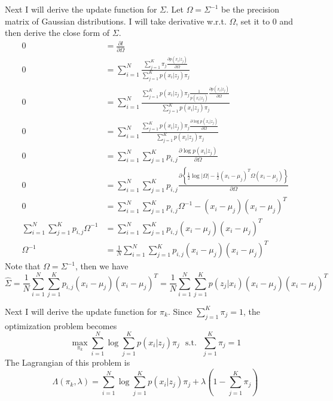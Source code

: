 \documentclass[12pt,oneside,a4paper]{article}
\begin{document}
Next I will derive the update function for $\Sigma$. Let $\Omega = \Sigma^{-1}$ be the precision matrix of Gaussian distributions. I will take derivative w.r.t. $\Omega$, set it to 0 and then derive the close form of $\Sigma$.
\begin{equation*}
\begin{aligned}
0 &= \frac{\partial l}{\partial \Omega}\\
0 &= \sum_{i = 1}^{N}\frac{\sum_{j = 1}^{K}\pi_{j}\frac{\partial p(x_{i}|z_{j})}{\partial \Omega}}{\sum_{j = 1}^{K}p(x_{i}|z_{j})\pi_{j}} \\
0 &= \sum_{i = 1}^{N} \frac{\sum_{j = 1}^{K}p(x_{i}|z_{j})\pi_{j} \frac{1}{p(x_{i}|z_{j})} \frac{\partial p(x_{i}|z_{j})}{\partial \Omega}}{\sum_{j = 1}^{K}p(x_{i}|z_{j})\pi_{j}} \\
0 &= \sum_{i = 1}^{N} \frac{\sum_{j = 1}^{K}p(x_{i}|z_{j})\pi_{j}  \frac{\partial \log p(x_{i}|z_{j})}{\partial \Omega}}{\sum_{j = 1}^{K}p(x_{i}|z_{j})\pi_{j}}\\
0 &= \sum_{i = 1}^{N} \sum_{j = 1}^{K}p_{i, j} \frac{\partial \log p(x_{i}|z_{j})}{\partial \Omega} \\
0 &= \sum_{i = 1}^{N} \sum_{j = 1}^{K}p_{i, j} \frac{\partial \left\{\frac{1}{2}\log|\Omega| - \frac{1}{2}(x_{i} - \mu_{j})^{T}\Omega (x_{i} - \mu_{j})\right\}}{\partial \Omega}\\
0 &= \sum_{i = 1}^{N} \sum_{j = 1}^{K}p_{i, j} \Omega^{-1} - (x_{i} - \mu_{j})(x_{i} - \mu_{j})^{T}\\
\sum_{i = 1}^{N} \sum_{j = 1}^{K} p_{i, j} \Omega^{-1} &= \sum_{i = 1}^{N} \sum_{j = 1}^{K}p_{i, j}(x_{i} - \mu_{j})(x_{i} - \mu_{j})^{T}\\
\Omega^{-1} &= \frac{1}{N}\sum_{i = 1}^{N} \sum_{j = 1}^{K}p_{i, j}(x_{i} - \mu_{j})(x_{i} - \mu_{j})^{T}
\end{aligned}
\end{equation*}
Note that $\Omega = \Sigma^{-1}$, then we have
$$\hat{\Sigma} = \frac{1}{N}\sum_{i = 1}^{N} \sum_{j = 1}^{K}p_{i, j}(x_{i} - \mu_{j})(x_{i} - \mu_{j})^{T} = \frac{1}{N}\sum_{i = 1}^{N} \sum_{j = 1}^{K}p(z_{j}|x_{i})(x_{i} - \mu_{j})(x_{i} - \mu_{j})^{T}$$

Next I will derive the update function for $\pi_{k}$. Since $\sum_{j = 1}^{K}\pi_{j} = 1$, the optimization problem becomes
$$\max_{\pi_{k}} \sum_{i = 1}^{N}{\log \sum_{j = 1}^{K}p(x_{i}|z_{j})\pi_{j}}~~~\mathrm{s.t.}~~~\sum_{j = 1}^{K}\pi_{j} = 1$$
The Lagrangian of this problem is
$$\Lambda(\pi_{k}, \lambda) = \sum_{i = 1}^{N}{\log \sum_{j = 1}^{K}p(x_{i}|z_{j})\pi_{j}} + \lambda\left(1 - \sum_{j = 1}^{K}\pi_{j}\right)$$
\end{document}
